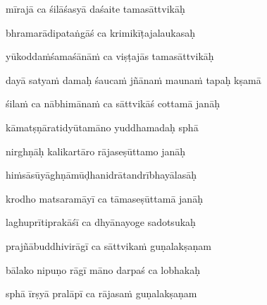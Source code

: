 mīrajā ca śilāśasyā daśaite tamasāttvikāḥ\thinspace{\dandab} \dontdisplaylinenum

bhramarādipataṅgāś ca krimikīṭajalaukasaḥ \veg\dontdisplaylinenum

yūkodda\.mśamaśānā\.m ca viṣṭajās tamasāttvikāḥ\thinspace{\dandab} \dontdisplaylinenum

dayā satya\.m damaḥ śauca\.m jñāna\.m mauna\.m tapaḥ kṣamā \veg\dontdisplaylinenum

śila\.m ca nābhimāna\.m ca sāttvikāś cottamā janāḥ\thinspace{\dandab} \dontdisplaylinenum

kāmatṣṇāratidyūtamāno yuddhamadaḥ sphā \veg\dontdisplaylinenum

nirghṇāḥ kalikartāro rājaseṣūttamo janāḥ\thinspace{\dandab} \dontdisplaylinenum

hi\.msāsūyāghṇāmūḍhanidrātandrībhayālasāḥ \veg\dontdisplaylinenum

krodho matsaramāyī ca tāmaseṣūttamā janāḥ\thinspace{\dandab} \dontdisplaylinenum

laghuprītiprakāśī ca dhyānayoge sadotsukaḥ \veg\dontdisplaylinenum

prajñābuddhivirāgī ca sāttvika\.m guṇalakṣaṇam\thinspace{\dandab} \dontdisplaylinenum

bālako nipuṇo rāgī māno darpaś ca lobhakaḥ \veg\dontdisplaylinenum

sphā īrṣyā pralāpī ca rājasa\.m guṇalakṣaṇam\thinspace{\dandab} \dontdisplaylinenum

